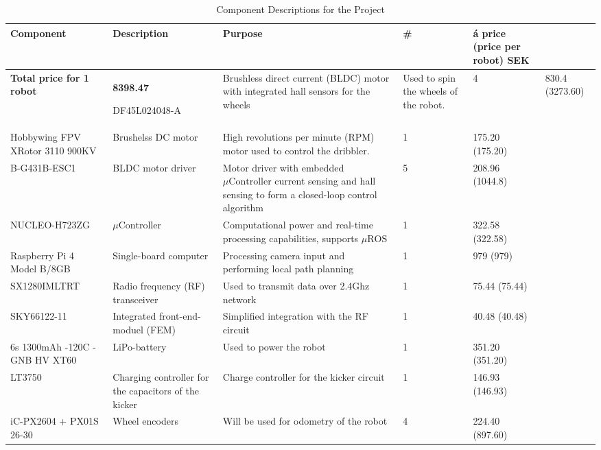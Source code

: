 \documentclass[a4paper,12pt]{article}
\begin{document}
  \begin{centering}
    \begin{longtable}{|p{3cm}|p{3cm}|p{3cm}|p{1cm}|p{2cm}| }
      \caption{Component Descriptions for the Project}
      \label{tab:component_bom}
      \\ \hline {} \textbf{Component} &
      \textbf{Description} & \textbf{Purpose} & \textbf{\#} & \textbf{á
        price (price per robot) SEK}\\ \endhead \hline

       \textbf{Total price for 1 robot} &
      \textbf{8398.47} \endlastfoot \hline

      DF45L024048-A & Brushless direct current (BLDC) motor with
      integrated hall sensors for the wheels & Used to spin the wheels
      of the robot. & 4 & 830.4 (3273.60)\\ \hline Hobbywing FPV XRotor
      3110 900KV & Brushelss DC motor & High revolutions per minute
      (RPM) motor used to control the dribbler. & 1 & 175.20 (175.20) \\
      \hline B-G431B-ESC1 & BLDC motor driver & Motor driver with
      embedded $\mu\text{Controller}$ current sensing and hall sensing
      to form a closed-loop control algorithm & 5 & 208.96 (1044.8) \\
      \hline NUCLEO-H723ZG & $\mu\text{Controller}$ & Computational
      power and real-time processing capabilities, supports
      $\mu\text{ROS}$ & 1 & 322.58 (322.58) \\ \hline Raspberry Pi 4
      Model B/8GB & Single-board computer & Processing camera input and
      performing local path planning & 1 & 979 (979) \\ \hline
      SX1280IMLTRT & Radio frequency (RF) transceiver & Used to transmit
      data over 2.4Ghz network & 1 & 75.44 (75.44) \\ \hline SKY66122-11
      & Integrated front-end-moduel (FEM) & Simplified integration with
      the RF circuit & 1 & 40.48 (40.48) \\ \hline 6s 1300mAh -120C -
      GNB HV XT60 & LiPo-battery & Used to power the robot & 1 & 351.20
      (351.20) \\ \hline LT3750 & Charging controller for the capacitors
      of the kicker & Charge controller for the kicker circuit & 1 &
      146.93 (146.93)\\ \hline iC-PX2604 + PX01S 26-30 & Wheel encoders
      & Will be used for odometry of the robot & 4 & 224.40 (897.60) \\

\end{longtable}
\end{centering}
\end{document}
